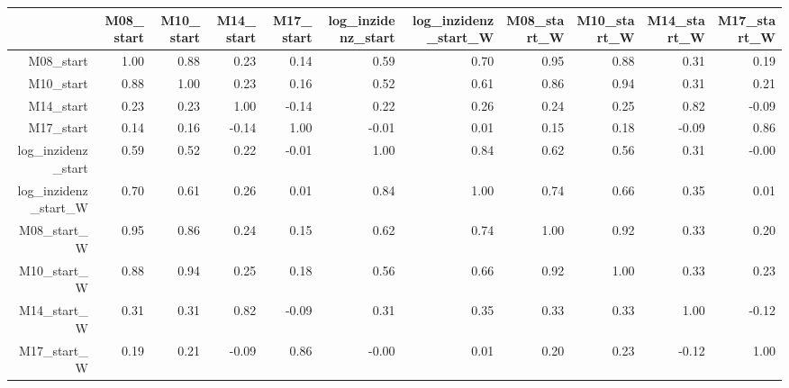 \begin{table}[ht]
\centering
\begin{tabular}{rrrrrrrrrrr}
  \hline
 & M08\_start & M10\_start & M14\_start & M17\_start & log\_inzidenz\_start & log\_inzidenz\_start\_W & M08\_start\_W & M10\_start\_W & M14\_start\_W & M17\_start\_W \\ 
  \hline
M08\_start & 1.00 & 0.88 & 0.23 & 0.14 & 0.59 & 0.70 & 0.95 & 0.88 & 0.31 & 0.19 \\ 
  M10\_start & 0.88 & 1.00 & 0.23 & 0.16 & 0.52 & 0.61 & 0.86 & 0.94 & 0.31 & 0.21 \\ 
  M14\_start & 0.23 & 0.23 & 1.00 & -0.14 & 0.22 & 0.26 & 0.24 & 0.25 & 0.82 & -0.09 \\ 
  M17\_start & 0.14 & 0.16 & -0.14 & 1.00 & -0.01 & 0.01 & 0.15 & 0.18 & -0.09 & 0.86 \\ 
  log\_inzidenz\_start & 0.59 & 0.52 & 0.22 & -0.01 & 1.00 & 0.84 & 0.62 & 0.56 & 0.31 & -0.00 \\ 
  log\_inzidenz\_start\_W & 0.70 & 0.61 & 0.26 & 0.01 & 0.84 & 1.00 & 0.74 & 0.66 & 0.35 & 0.01 \\ 
  M08\_start\_W & 0.95 & 0.86 & 0.24 & 0.15 & 0.62 & 0.74 & 1.00 & 0.92 & 0.33 & 0.20 \\ 
  M10\_start\_W & 0.88 & 0.94 & 0.25 & 0.18 & 0.56 & 0.66 & 0.92 & 1.00 & 0.33 & 0.23 \\ 
  M14\_start\_W & 0.31 & 0.31 & 0.82 & -0.09 & 0.31 & 0.35 & 0.33 & 0.33 & 1.00 & -0.12 \\ 
  M17\_start\_W & 0.19 & 0.21 & -0.09 & 0.86 & -0.00 & 0.01 & 0.20 & 0.23 & -0.12 & 1.00 \\ 
   \hline
\end{tabular}
\end{table}
